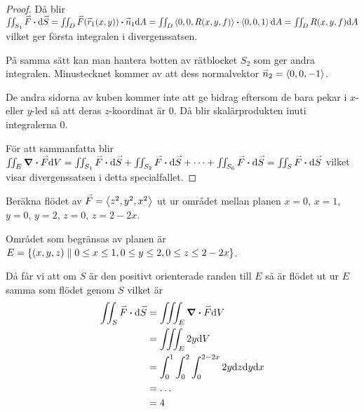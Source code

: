 \documentclass[a4paper]{article}
\begin{document}
\begin{sats}[Divergenssatsen]
\begin{proof}
        Då blir \(
            \iint_{S_1} \vef \sprod \dd \ve{S} = \iint_D \vef(\ver_1(x,y)) \sprod \ven_1 \dd A
                = \iint_D \lang 0,0,R(x,y,f)\rang \sprod \lang 0,0,1\rang \dd A
                = \iint_D R(x,y,f) \dd A
        \) vilket ger första integralen i divergenssatsen.

        På samma sätt kan man hantera botten av rätblocket \(
            S_2
        \) som ger andra integralen. Minustecknet kommer av att dess normalvektor \(
            \accentset{\rightharpoonup}{n}_2 = \left\langle 0,0,-1\right\rangle
        \).

        De andra sidorna av kuben kommer inte att ge bidrag eftersom de bara 
        pekar i \(
            x
        \)- eller \(
            y
        \)-led så att deras \(
            z
        \)-koordinat är \(
            0
        \). Då blir skalärprodukten inuti integralerna \(
            0
        \).

        För att sammanfatta blir \(
            \iint_E \div{\vef} \dd V = \iint_{S_1} \vef \sprod \dd \ve{S} 
                    + \iint_{S_2} \vef \sprod \dd \ve{S} 
                    + \cdots
                    + \iint_{S_6} \vef \sprod \dd \ve{S} 
                = \iint_S \vef \sprod \dd \ve{S}
        \) vilket visar divergenssatsen i detta specialfallet.
    \end{proof}
\end{sats}

\begin{ex}
    Beräkna flödet av \(
        \accentset{\rightharpoonup}{F} = \left\langle z^2, y^2, x^2 \right\rangle
    \) ut ur området mellan planen \(
        x=0
    \), \(
        x=1
    \), \(
        y=0
    \), \(
        y=2
    \), \(
        z=0
    \), \(
        z=2-2x
    \).

    Området som begränsas av planen är \(
        E = \{ (x,y,z) \; \| \; 0 \leq x \leq 1, 0 \leq y \leq 2, 0 \leq z \leq 2-2x \}
    \). 

    Då får vi att om \(
        S
    \) är den positivt orienterade randen till \(
        E
    \) så är flödet ut ur \(
        E
    \) samma som flödet genom \(
        S
    \) vilket är 
    \begin{align*}
        \iint_S \vef \sprod \dd \ve{S} &= \iiint_E \div{\vef} \dd V \\
            &= \iiint_E 2y \dd V \\
            &= \int_0^1 \int_0^2 \int_0^{2-2x} 2y \dd z \dd y \dd x \\
            &= \dots \\
            &= 4
    \end{align*}
\end{ex}
\end{document}
